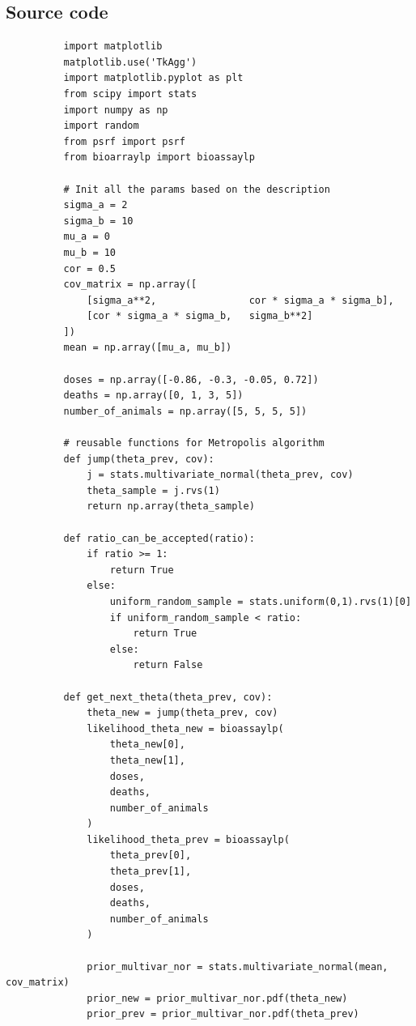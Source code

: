 \documentclass[11pt,a4paper,english]{article}
\begin{document}
      \begin{appendices}
        \section{Source code}
        \begin{verbatim}
          import matplotlib
          matplotlib.use('TkAgg')
          import matplotlib.pyplot as plt
          from scipy import stats
          import numpy as np
          import random
          from psrf import psrf
          from bioarraylp import bioassaylp

          # Init all the params based on the description
          sigma_a = 2
          sigma_b = 10
          mu_a = 0
          mu_b = 10
          cor = 0.5
          cov_matrix = np.array([
              [sigma_a**2,                cor * sigma_a * sigma_b],
              [cor * sigma_a * sigma_b,   sigma_b**2]
          ])
          mean = np.array([mu_a, mu_b])

          doses = np.array([-0.86, -0.3, -0.05, 0.72])
          deaths = np.array([0, 1, 3, 5])
          number_of_animals = np.array([5, 5, 5, 5])

          # reusable functions for Metropolis algorithm
          def jump(theta_prev, cov):
              j = stats.multivariate_normal(theta_prev, cov)
              theta_sample = j.rvs(1)
              return np.array(theta_sample)

          def ratio_can_be_accepted(ratio):
              if ratio >= 1:
                  return True
              else:
                  uniform_random_sample = stats.uniform(0,1).rvs(1)[0]
                  if uniform_random_sample < ratio:
                      return True
                  else:
                      return False

          def get_next_theta(theta_prev, cov):
              theta_new = jump(theta_prev, cov)
              likelihood_theta_new = bioassaylp(
                  theta_new[0],
                  theta_new[1],
                  doses,
                  deaths,
                  number_of_animals
              )
              likelihood_theta_prev = bioassaylp(
                  theta_prev[0],
                  theta_prev[1],
                  doses,
                  deaths,
                  number_of_animals
              )

              prior_multivar_nor = stats.multivariate_normal(mean, cov_matrix)
              prior_new = prior_multivar_nor.pdf(theta_new)
              prior_prev = prior_multivar_nor.pdf(theta_prev)


\end{verbatim}
\end{appendices}
\end{document}

